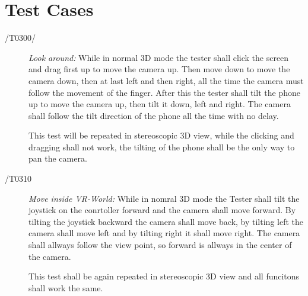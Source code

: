 \section{Test Cases}





\begin{description}
  \item[/T0300/]
    \textit{Look around:} While in normal 3D mode the tester shall click the screen and drag first up to move the camera up.
    Then move down to move the camera down, then at last left and then right, all the time the camera must follow the movement of the finger.
    After this the tester shall tilt the phone up to move the camera up, then tilt it down, left and right. The camera shall follow the tilt direction of the phone all the time with no delay.

    This test will be repeated in stereoscopic 3D view, while the clicking and dragging shall not work, the tilting of the phone shall be the only way to pan the camera.
\end{description}

\begin{description}
  \item[/T0310]
    \textit{Move inside VR-World:} While in nomral 3D mode the Tester shall tilt the joystick on the conrtoller forward and the camera shall move forward.
    By tilting the joystick backward the camera shall move back, by tilting left the camera shall move left and by tilting right it shall move right.
    The camera shall allways follow the view point, so forward is allways in the center of the camera.

    This test shall be again repeated in stereoscopic 3D view and all funcitons shall work the same.
\end{description}
